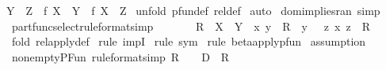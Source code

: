 \begin{isabellebody}
{\isachardoublequoteopen}Y\ {\isacharless}{\isacharequal}\ Z\ {\isacharminus}{\isacharminus}{\isachargreater}\ f{\isacharcolon}\ {\isacharparenleft}X\ {\isacharminus}{\isacharbar}{\isacharminus}{\isachargreater}\ Y{\isacharparenright}\ {\isacharminus}{\isacharminus}{\isachargreater}\ f{\isacharcolon}\ {\isacharparenleft}X\ {\isacharminus}{\isacharbar}{\isacharminus}{\isachargreater}\ Z{\isacharparenright}{\isachardoublequoteclose}\isanewline
%
\isadelimproof
%
\endisadelimproof
%
\isatagproof
{}\isamarkupfalse%
\ {\isacharparenleft}unfold\ pfun{\isacharunderscore}def\ rel{\isacharunderscore}def{\isacharparenright}\isanewline
{}\isamarkupfalse%
\ auto\isanewline
{}\isamarkupfalse%
%
\endisatagproof
{\isafoldproof}%
%
\isadelimproof
\isanewline
%
\endisadelimproof
\isanewline
{}\isamarkupfalse%
\ dom{\isacharunderscore}implies{\isacharunderscore}ran\ {\isacharbrackleft}simp{\isacharbrackright}\isanewline
\isanewline
{}\isamarkupfalse%
\ part{\isacharunderscore}func{\isacharunderscore}select{\isacharbrackleft}rule{\isacharunderscore}format{\isacharcomma}simp{\isacharbrackright}{\isacharcolon}\ \ \ \ \ \ \ \isanewline
{\isachardoublequoteopen}R\ {\isacharcolon}\ {\isacharparenleft}X\ {\isacharminus}{\isacharbar}{\isacharminus}{\isachargreater}\ Y{\isacharparenright}\ {\isacharminus}{\isacharminus}{\isachargreater}\ {\isacharparenleft}x{\isacharcomma}\ y{\isacharparenright}\ {\isacharcolon}\ R\ {\isacharminus}{\isacharminus}{\isachargreater}\ y\ {\isacharequal}\ {\isacharparenleft}{\isacharat}\ z{\isachardot}\ {\isacharparenleft}x{\isacharcomma}\ z{\isacharparenright}\ {\isacharcolon}\ R{\isacharparenright}{\isachardoublequoteclose}\isanewline
%
\isadelimproof
%
\endisadelimproof
%
\isatagproof
{}\isamarkupfalse%
\ {\isacharparenleft}fold\ rel{\isacharunderscore}apply{\isacharunderscore}def{\isacharparenright}\isanewline
{}\isamarkupfalse%
\ {\isacharparenleft}rule\ impI{\isacharparenright}{\isacharplus}\isanewline
{}\isamarkupfalse%
\ {\isacharparenleft}rule\ sym{\isacharparenright}\isanewline
{}\isamarkupfalse%
\ {\isacharparenleft}rule\ beta{\isacharunderscore}apply{\isacharunderscore}pfun{\isacharparenright}\isanewline
{}\isamarkupfalse%
\ assumption{\isacharplus}\isanewline
{}\isamarkupfalse%
%
\endisatagproof
{\isafoldproof}%
%
\isadelimproof
\isanewline
%
\endisadelimproof
\isanewline
{}\isamarkupfalse%
\ nonempty{\isacharunderscore}PFun\ {\isacharbrackleft}rule{\isacharunderscore}format{\isacharcomma}simp{\isacharbrackright}{\isacharcolon}\ {\isachardoublequoteopen}R\ {\isachartilde}{\isacharequal}\ {\isacharbraceleft}{\isacharbraceright}\ {\isacharminus}{\isacharminus}{\isachargreater}\ {\isacharparenleft}D\ {\isacharminus}{\isacharbar}{\isacharminus}{\isachargreater}\ R{\isacharparenright}\ {\isachartilde}{\isacharequal}\ {\isacharbraceleft}{\isacharbraceright}{\isachardoublequoteclose}\isanewline

\end{isabellebody}
